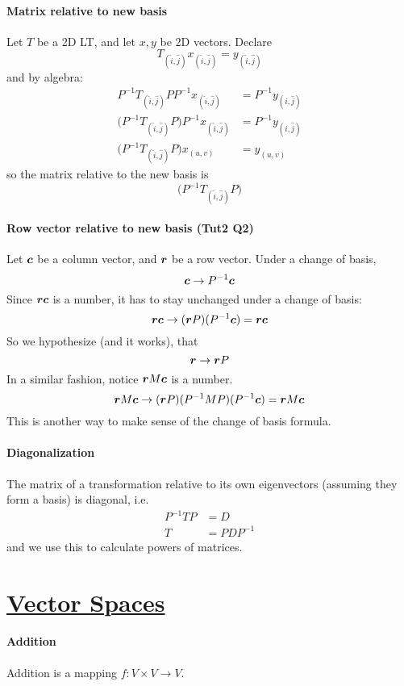 \documentclass[a4paper]{article}
\newcommand{\inv}{^{-1}}
\begin{document}
\begin{multicols*}{4}
    \paragraph{Matrix relative to new basis} Let $T$ be a 2D LT, and let $x,y$ be 2D vectors. Declare
      \[ T_{(\hat{i},\hat{j})} x_{(\hat{i},\hat{j})} = y_{(\hat{i},\hat{j})} \]
      and by algebra:
      \begin{align*}
        P\inv T_{(\hat{i},\hat{j})} P P\inv x_{(\hat{i},\hat{j})} &= P\inv y_{(\hat{i},\hat{j})} \\
        \Big( P\inv T_{(\hat{i},\hat{j})} P \Big) P\inv x_{(\hat{i},\hat{j})} &= P\inv y_{(\hat{i},\hat{j})} \\
        \Big( P\inv T_{(\hat{i},\hat{j})} P \Big) x_{(u,v)} &= y_{(u,v)}
      \end{align*}
      so the matrix relative to the new basis is
      \[ \Big( P\inv T_{(\hat{i},\hat{j})} P \Big) \]
    \paragraph{Row vector relative to new basis (Tut2 Q2)} Let $\boldsymbol{c}$ be a column vector, and $\boldsymbol{r}$ be a row vector. Under a change of basis,
      \[ \vb{c} \rightarrow P\inv\vb{c} \]
      Since $\boldsymbol{rc}$ is a number, it has to stay unchanged under a change of basis:
      \[ \vb{rc} \rightarrow (\vb{r}P) (P\inv\vb{c}) = \vb{rc} \]
      So we hypothesize (and it works), that
      \[ \boldsymbol{r} \rightarrow \boldsymbol{r}P \]
      In a similar fashion, notice $\boldsymbol{r}M\boldsymbol{c}$ is a number.
      \[ \vb{r}M\vb{c} \rightarrow (\vb{r}P) (P\inv M P) (P\inv\vb{c}) = \vb{r}M\vb{c} \]
      This is another way to make sense of the change of basis formula.
    \paragraph{Diagonalization} The matrix of a transformation relative to its own eigenvectors (assuming they form a basis) is diagonal, i.e.
      \begin{align*}
        P\inv T P &= D \\
        T &= P D P\inv
      \end{align*}
      and we use this to calculate powers of matrices.
  \section*{\underline{Vector Spaces}}
    \paragraph{Addition} Addition is a mapping \( f: V \times V \rightarrow V \).

\end{multicols*}
\end{document}
